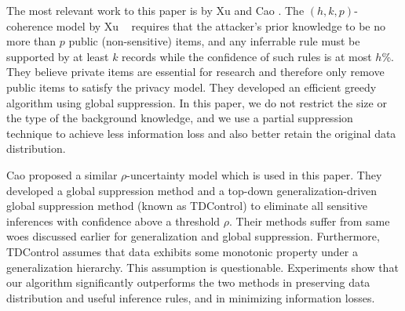 The most relevant work to this paper is by Xu \etal \cite{Xu:2008:ATD} and
Cao \etal \cite{Cao:2010:rho}. The $(h,k,p)$-coherence model by Xu \etal~
requires that the attacker's prior knowledge to be no more than $p$ public
(non-sensitive) items, and any inferrable rule must be supported by at least
$k$ records while the confidence of such rules is at most $h$\%. They believe
private items are essential for research and therefore only remove public
items to satisfy the privacy model. They developed an efficient greedy
algorithm using global suppression. In this paper, we do not restrict the
size or the type of the background knowledge, and we use a partial
suppression technique to achieve less information loss and also better retain
the original data distribution.
%



Cao \etal \cite{Cao:2010:rho} proposed a similar $\rho$-uncertainty model
which is used in this paper.
They developed a global suppression method and a top-down
generalization-driven global suppression method (known as TDControl)
to eliminate all sensitive inferences with confidence above
a threshold $\rho$.
Their methods suffer from same woes discussed earlier for generalization and
global suppression.
Furthermore, TDControl 
assumes that data exhibits some monotonic property under a generalization
hierarchy. This assumption is questionable.
Experiments show that our algorithm significantly outperforms the 
two methods in preserving data distribution and useful
inference rules, and in minimizing information losses.
